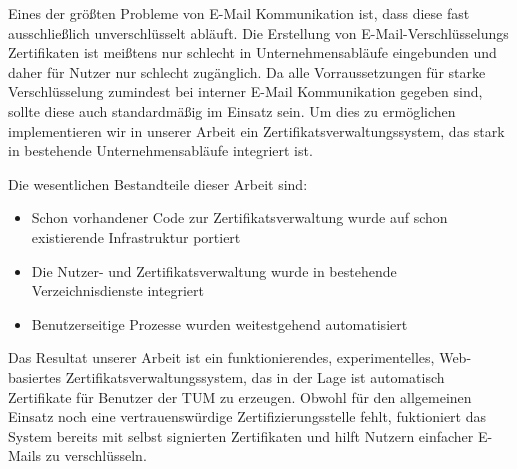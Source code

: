 \small

Eines der größten Probleme von E-Mail Kommunikation ist, dass diese fast ausschließlich unverschlüsselt abläuft.
Die Erstellung von E-Mail-Verschlüsselungs Zertifikaten ist meißtens nur schlecht in Unternehmensabläufe eingebunden und
daher für Nutzer nur schlecht zugänglich.
Da alle Vorraussetzungen für starke Verschlüsselung zumindest bei interner E-Mail Kommunikation gegeben sind, sollte
diese auch standardmäßig im Einsatz sein.
Um dies zu ermöglichen implementieren wir in unserer Arbeit ein Zertifikatsverwaltungssystem, das stark in bestehende
Unternehmensabläufe integriert ist.

Die wesentlichen Bestandteile dieser Arbeit sind:
\begin{itemize}
    \item Schon vorhandener Code zur Zertifikatsverwaltung wurde auf schon existierende Infrastruktur portiert
    \item Die Nutzer- und Zertifikatsverwaltung wurde in bestehende Verzeichnisdienste integriert
    \item Benutzerseitige Prozesse wurden weitestgehend automatisiert
\end{itemize}

Das Resultat unserer Arbeit ist ein funktionierendes, experimentelles, Web-basiertes Zertifikatsverwaltungssystem, das
in der Lage ist automatisch Zertifikate für Benutzer der TUM zu erzeugen.
Obwohl für den allgemeinen Einsatz noch eine vertrauenswürdige Zertifizierungsstelle fehlt, fuktioniert das System
bereits mit selbst signierten Zertifikaten und hilft Nutzern einfacher E-Mails zu verschlüsseln.

